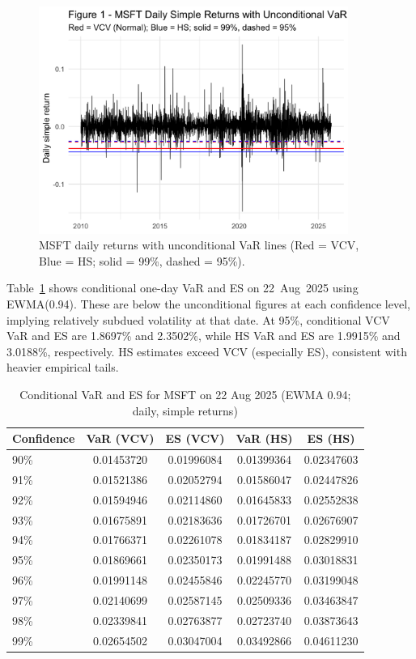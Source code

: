 \documentclass[11pt]{article}
\begin{document}
\begin{figure}[H]
\centering
\includegraphics[width=0.9\textwidth]{figure_1.png}
\caption{MSFT daily returns with unconditional VaR lines (Red = VCV, Blue = HS; solid = 99\%, dashed = 95\%).}
\label{fig:uncond}
\end{figure}

Table~\ref{tab:cond} shows conditional one-day VaR and ES on 22~Aug~2025 using EWMA(0.94).
These are below the unconditional figures at each confidence level, implying relatively subdued volatility at that date.
At 95\%, conditional VCV VaR and ES are 1.8697\% and 2.3502\%, while HS VaR and ES are 1.9915\% and 3.0188\%, respectively.
HS estimates exceed VCV (especially ES), consistent with heavier empirical tails.

\begin{table}[H]
\centering
\caption{Conditional VaR and ES for MSFT on 22 Aug 2025 (EWMA 0.94; daily, simple returns)}
\label{tab:cond} %
\begin{tabular}{lcccc}
\toprule
Confidence & VaR (VCV) & ES (VCV) & VaR (HS) & ES (HS) \\
\midrule
90\% & 0.01453720 & 0.01996084 & 0.01399364 & 0.02347603 \\
91\% & 0.01521386 & 0.02052794 & 0.01586047 & 0.02447826 \\
92\% & 0.01594946 & 0.02114860 & 0.01645833 & 0.02552838 \\
93\% & 0.01675891 & 0.02183636 & 0.01726701 & 0.02676907 \\
94\% & 0.01766371 & 0.02261078 & 0.01834187 & 0.02829910 \\
95\% & 0.01869661 & 0.02350173 & 0.01991488 & 0.03018831 \\
96\% & 0.01991148 & 0.02455846 & 0.02245770 & 0.03199048 \\
97\% & 0.02140699 & 0.02587145 & 0.02509336 & 0.03463847 \\
98\% & 0.02339841 & 0.02763877 & 0.02723740 & 0.03873643 \\
99\% & 0.02654502 & 0.03047004 & 0.03492866 & 0.04611230 \\
\bottomrule
\end{tabular}
\end{table}
\end{document}
